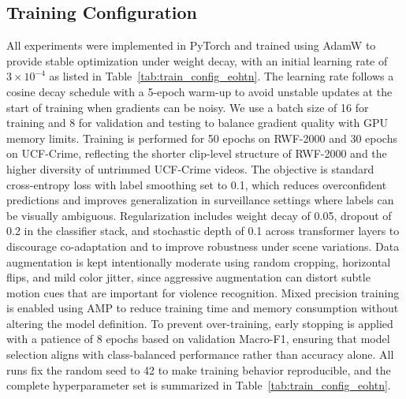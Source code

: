 \documentclass[AMA,Times1COL]{WileyNJDv5} %
\begin{document}
\subsection{Training Configuration}
All experiments were implemented in PyTorch and trained using AdamW to provide stable optimization under weight decay, with an initial learning rate of $3 \times 10^{-4}$ as listed in Table~\ref{tab:train_config_eohtn}. The learning rate follows a cosine decay schedule with a 5-epoch warm-up to avoid unstable updates at the start of training when gradients can be noisy. We use a batch size of 16 for training and 8 for validation and testing to balance gradient quality with GPU memory limits. Training is performed for 50 epochs on RWF-2000 and 30 epochs on UCF-Crime, reflecting the shorter clip-level structure of RWF-2000 and the higher diversity of untrimmed UCF-Crime videos. The objective is standard cross-entropy loss with label smoothing set to 0.1, which reduces overconfident predictions and improves generalization in surveillance settings where labels can be visually ambiguous. Regularization includes weight decay of 0.05, dropout of 0.2 in the classifier stack, and stochastic depth of 0.1 across transformer layers to discourage co-adaptation and to improve robustness under scene variations. Data augmentation is kept intentionally moderate using random cropping, horizontal flips, and mild color jitter, since aggressive augmentation can distort subtle motion cues that are important for violence recognition. Mixed precision training is enabled using AMP to reduce training time and memory consumption without altering the model definition. To prevent over-training, early stopping is applied with a patience of 8 epochs based on validation Macro-F1, ensuring that model selection aligns with class-balanced performance rather than accuracy alone. All runs fix the random seed to 42 to make training behavior reproducible, and the complete hyperparameter set is summarized in Table~\ref{tab:train_config_eohtn}.
\end{document}
